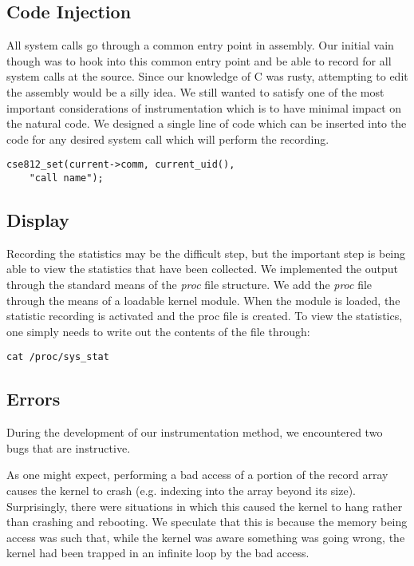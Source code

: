 \documentclass[conference]{IEEEtran}
\begin{document}
\subsection{Code Injection}
All system calls go through a common entry point in assembly.
Our initial vain though was to hook into this common entry point and be able to record for all system calls at the source.
Since our knowledge of C was rusty, attempting to edit the assembly would be a silly idea.
We still wanted to satisfy one of the most important considerations of instrumentation which is to have minimal impact on the natural code.
We designed a single line of code which can be inserted into the code for any desired system call which will perform the recording.

\begin{verbatim}
cse812_set(current->comm, current_uid(),
    "call name");
\end{verbatim}

\subsection{Display}
Recording the statistics may be the difficult step, but the important step is being able to view the statistics that have been collected.
We implemented the output through the standard means of the \textit{proc} file structure.
We add the \textit{proc} file through the means of a loadable kernel module.
When the module is loaded, the statistic recording is activated and the proc file is created.
To view the statistics, one simply needs to write out the contents of the file through:

\begin{verbatim}
cat /proc/sys_stat
\end{verbatim}

\subsection{Errors}
During the development of our instrumentation method, we encountered two bugs that are instructive.

As one might expect, performing a bad access of a portion of the record array causes the kernel to crash (e.g. indexing into the array beyond its size).
Surprisingly, there were situations in which this caused the kernel to hang rather than crashing and rebooting.
We speculate that this is because the memory being access was such that, while the kernel was aware something was going wrong, the kernel had been trapped in an infinite loop by the bad access.
\end{document}
